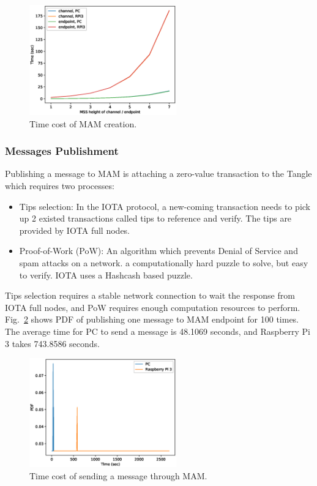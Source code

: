 \documentclass[conference]{IEEEtran}
\begin{document}
\begin{figure}[!t]
    \centering
    \includegraphics[width=2.5in]{mam_create}
    \caption{Time cost of MAM creation.}
    \label{fig:mam_create}
\end{figure}

\subsubsection{Messages Publishment}
Publishing a message to MAM is attaching a zero-value transaction to the Tangle which requires two processes:
\begin{itemize}
	\item	Tips selection: In the IOTA protocol, a new-coming transaction needs to pick up 2 existed transactions called tips to reference and verify. The tips are provided by IOTA full nodes.
	\item	Proof-of-Work (PoW): An algorithm which prevents Denial of Service and spam attacks on a network. a computationally hard puzzle to solve, but easy to verify. IOTA uses a Hashcash\cite{Hashcash} based puzzle.
\end{itemize}

Tips selection requires a stable network connection to wait the response from IOTA full nodes, and PoW requires enough computation resources to perform. Fig.~\ref{fig:mam_send} shows PDF of publishing one message to MAM endpoint for 100 times. The average time for PC to send a message is 48.1069 seconds, and Raspberry Pi 3 takes 743.8586 seconds.

\begin{figure}[!t]
    \centering
    \includegraphics[width=2.5in]{mam_send}
    \caption{Time cost of sending a message through MAM.}
    \label{fig:mam_send}
\end{figure}
\end{document}
